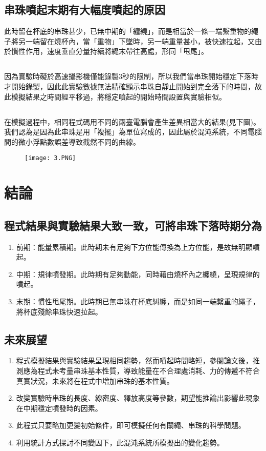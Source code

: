 \documentclass[11pt,twoside,b5paper]{article}
\begin{document}
\subsection{串珠噴起末期有大幅度噴起的原因}
此時留在杯底的串珠甚少，已無中期的「纏繞」，而是相當於一條一端繫重物的繩子將另一端留在燒杯內，當「重物」下墜時，另一端重量甚小，被快速拉起，又由於慣性作用，速度垂直分量持續將繩末帶往高處，形同「甩尾」。

\subsection{}
因為實驗時礙於高速攝影機僅能錄製3秒的限制，所以我們當串珠開始穩定下落時才開始錄製，因此此實驗數據無法精確顯示串珠自靜止開始到完全落下的時間，故此模擬結果之時間經平移過，將穩定噴起的開始時間設置與實驗相似。

\subsection{}
在模擬過程中，相同程式碼用不同的兩臺電腦會產生差異相當大的結果(見下圖)。我們認為是因為此串珠是用「複擺」為單位寫成的，因此屬於混沌系統，不同電腦間的微小浮點數誤差導致截然不同的曲線。

\begin{figure}[H]
    \centering
    \texttt{[image: 3.PNG]}
\end{figure}

\section{結論}

\subsection{程式結果與實驗結果大致一致，可將串珠下落時期分為}
\begin{enumerate}
    \item 前期：能量累積期。此時期未有足夠下方位能傳換為上方位能，是故無明顯噴起。 
    \item 中期：規律噴發期。此時期有足夠動能，同時藉由燒杯內之纏繞，呈現規律的噴起。
    \item 末期：慣性甩尾期。此時期已無串珠在杯底糾纏，而是如同一端繫重的繩子，將杯底殘餘串珠快速拉起。
\end{enumerate}

\subsection{未來展望}
\begin{enumerate}
    \item 程式模擬結果與實驗結果呈現相同趨勢，然而噴起時間略短，參閱論文後，推測應為程式未考量串珠基本性質，導致能量在不合理處消耗、力的傳遞不符合真實狀況，未來將在程式中增加串珠的基本性質。
    \item 改變實驗時串珠的長度、線密度、釋放高度等參數，期望能推論出影響此現象在中期穩定噴發時的因素。
    \item 此程式只要略加更變初始條件，即可模擬任何有關繩、串珠的科學問題。
    \item 利用統計方式探討不同變因下，此混沌系統所模擬出的變化趨勢。
\end{enumerate}

\medskip
\renewcommand{\refname}{\S\quad 參考資料}
\nocite{*}


\end{document}
